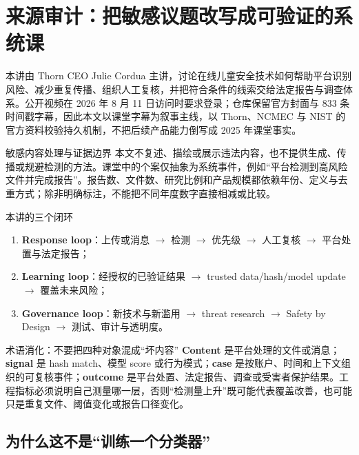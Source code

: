 \documentclass[a4paper]{article}
\begin{document}
\makecscover

\section{来源审计：把敏感议题改写成可验证的系统课}

本讲由 Thorn CEO Julie Cordua 主讲，讨论在线儿童安全技术如何帮助平台识别风险、减少重复传播、组织人工复核，并把符合条件的线索交给法定报告与调查体系。公开视频在 2026 年 8 月 11 日访问时要求登录；仓库保留官方封面与 833 条时间戳字幕，因此本文以课堂字幕为叙事主线，以 Thorn、NCMEC 与 NIST 的官方资料校验持久机制，不把后续产品能力倒写成 2025 年课堂事实。

\begin{warningbox}{敏感内容处理与证据边界}
本文不复述、描绘或展示违法内容，也不提供生成、传播或规避检测的方法。课堂中的个案仅抽象为系统事件，例如“平台检测到高风险文件并完成报告”。报告数、文件数、研究比例和产品规模都依赖年份、定义与去重方式；除非明确标注，不能把不同年度数字直接相减或比较。
\end{warningbox}

\begin{importantbox}{本讲的三个闭环}
\begin{enumerate}
  \item \textbf{Response loop}：上传或消息 $\rightarrow$ 检测 $\rightarrow$ 优先级 $\rightarrow$ 人工复核 $\rightarrow$ 平台处置与法定报告；
  \item \textbf{Learning loop}：经授权的已验证结果 $\rightarrow$ trusted data/hash/model update $\rightarrow$ 覆盖未来风险；
  \item \textbf{Governance loop}：新技术与新滥用 $\rightarrow$ threat research $\rightarrow$ Safety by Design $\rightarrow$ 测试、审计与透明度。
\end{enumerate}
\end{importantbox}

\begin{knowledgebox}{术语消化：不要把四种对象混成“坏内容”}
\textbf{Content} 是平台处理的文件或消息；\textbf{signal} 是 hash match、模型 score 或行为模式；\textbf{case} 是按账户、时间和上下文组织的可复核事件；\textbf{outcome} 是平台处置、法定报告、调查或受害者保护结果。工程指标必须说明自己测量哪一层，否则“检测量上升”既可能代表覆盖改善，也可能只是重复文件、阈值变化或报告口径变化。
\end{knowledgebox}

\subsection{为什么这不是“训练一个分类器”}
\end{document}
